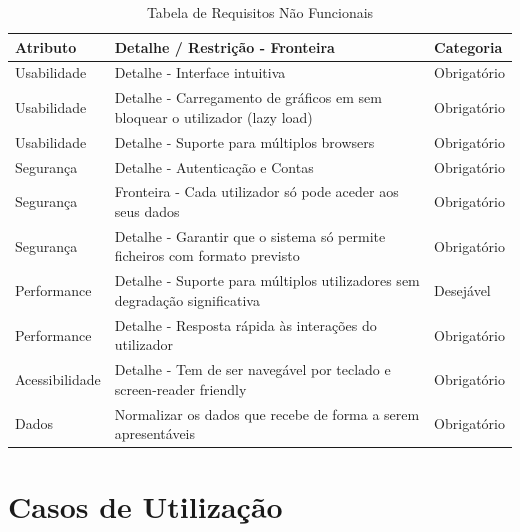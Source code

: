 \begin{table}[h!]
    \centering
    \begin{tabular}{|l|p{7cm}|l|}
    \hline
    \textbf{Atributo} & \textbf{Detalhe / Restrição - Fronteira} & \textbf{Categoria} \\
    \hline
    Usabilidade & Detalhe - Interface intuitiva & Obrigatório \\
    Usabilidade & Detalhe - Carregamento de gráficos em sem bloquear o utilizador (lazy load) & Obrigatório \\
    Usabilidade & Detalhe - Suporte para múltiplos browsers & Obrigatório \\
    Segurança & Detalhe - Autenticação e Contas & Obrigatório \\
    Segurança & Fronteira - Cada utilizador só pode aceder aos seus dados & Obrigatório \\
    Segurança & Detalhe - Garantir que o sistema só permite ficheiros com formato previsto & Obrigatório \\
    Performance & Detalhe - Suporte para múltiplos utilizadores sem degradação significativa & Desejável \\
    Performance & Detalhe - Resposta rápida às interações do utilizador & Obrigatório \\
    Acessibilidade & Detalhe - Tem de ser navegável por teclado e screen-reader friendly & Obrigatório \\
    Dados & Normalizar os dados que recebe de forma a serem apresentáveis & Obrigatório \\

    \hline
    \end{tabular}
    \caption{Tabela de Requisitos Não Funcionais}
    \label{tab:requisitosNaofuncionais}
    \end{table}
    

\chapter{Casos de Utilização}
\label{ch:casosUtilizacao}

